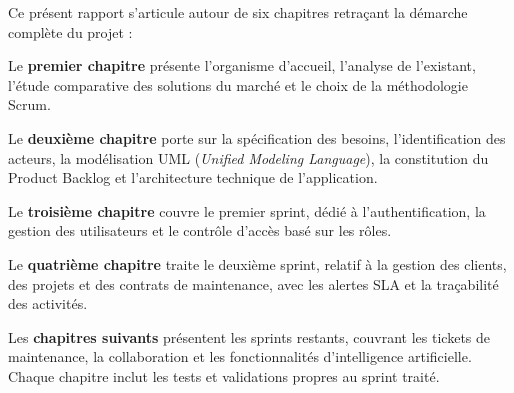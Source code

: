 Ce présent rapport s'articule autour de six chapitres retraçant la démarche complète du projet :
\newline

Le \textbf{premier chapitre} présente l'organisme d'accueil, l'analyse de l'existant, l'étude comparative des solutions du marché et le choix de la méthodologie Scrum.

Le \textbf{deuxième chapitre} porte sur la spécification des besoins, l'identification des acteurs, la modélisation UML (\textit{Unified Modeling Language}), la constitution du Product Backlog et l'architecture technique de l'application.

Le \textbf{troisième chapitre} couvre le premier sprint, dédié à l'authentification, la gestion des utilisateurs et le contrôle d'accès basé sur les rôles.

Le \textbf{quatrième chapitre} traite le deuxième sprint, relatif à la gestion des clients, des projets et des contrats de maintenance, avec les alertes SLA et la traçabilité des activités.

Les \textbf{chapitres suivants} présentent les sprints restants, couvrant les tickets de maintenance, la collaboration et les fonctionnalités d'intelligence artificielle. Chaque chapitre inclut les tests et validations propres au sprint traité.



